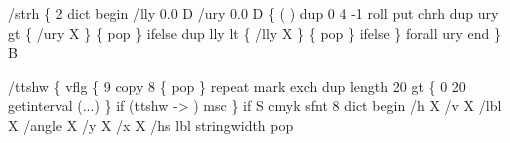 \documentclass[11pt]{article}
\def\nwendcode{\endtrivlist \endgroup} %
\let\nwdocspar=\par                    %
\begin{document}
\nwenddocs{}\endmoddef
/strh \{         %
  2 dict begin  %
    /lly 0.0 D  %
    /ury 0.0 D  %
    \{           %
      ( )       %
      dup       %
      0         %
      4 -1 roll %
      put       %
      chrh      %
      dup       %
      ury gt \{  %
        /ury X  %
      \} \{       %
        pop     %
      \} ifelse  %
      dup       %
      lly lt \{  %
        /lly X  %
      \} \{       %
        pop     %
      \} ifelse  %
    \} forall    %
    ury         %
  end           %
\} B             %
\eatline
{}\nwendcode{}\nwdocspar
\nwenddocs{}\endmoddef
/ttshw \{            %
  vflg \{               %
    9 copy             %
    8 \{                %
      pop              %
    \} repeat           %
    mark exch          %
    dup                %
    length 20 gt \{     %
      0 20 getinterval %
      (...)            %
    \} if               %
    (ttshw -> ) msc    %
  \} if                 %
  S                 %
    cmyk            %
    sfnt            %
    8 dict begin    %
      /h X          %
      /v X          %
      /lbl X        %
      /angle X      %
      /y X          %
      /x X          %
      /hs           %
        lbl         %
        stringwidth %
        pop         %
\end{document}
